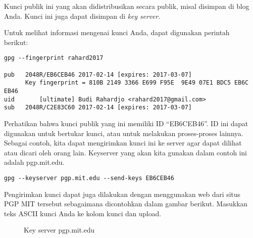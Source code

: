 Kunci publik ini yang akan didistribusikan secara publik, misal disimpan di
blog Anda. Kunci ini juga dapat disimpan di {\em key server}.

Untuk melihat informasi mengenai kunci Anda, dapat digunakan perintah berikut:

\begin{verbatim}
gpg --fingerprint rahard2017

pub   2048R/EB6CEB46 2017-02-14 [expires: 2017-03-07]
      Key fingerprint = 810B 2149 3366 E699 F95E  9E49 07E1 BDC5 EB6C EB46
uid       [ultimate] Budi Rahardjo <rahard2017@gmail.com>
sub   2048R/C2E83C60 2017-02-14 [expires: 2017-03-07]
\end{verbatim}

Perhatikan bahwa kunci publik yang ini memiliki ID ``EB6CEB46''. ID ini dapat
digunakan untuk bertukar kunci, atau untuk melakukan proses-proses lainnya.
Sebagai contoh, kita dapat mengirimkan kunci ini ke server agar dapat dilihat
atau dicari oleh orang lain. Keyserver yang akan kita gunakan dalam contoh ini
adalah pgp.mit.edu.

\begin{verbatim}
gpg --keyserver pgp.mit.edu --send-keys EB6CEB46
\end{verbatim}

Pengirimkan kunci dapat juga dilakukan dengan menggunakan web dari situs PGP
MIT tersebut sebagaimana dicontohkan dalam gambar berikut. Masukkan teks ASCII
kunci Anda ke kolom kunci dan upload.

\begin{figure}[ht]
\caption{Key server pgp.mit.edu}
\label{fig:pgp-mit}
\end{figure}


\begin{mdframed}[backgroundcolor=blue!20] 
\begin{ExerciseList}
   \Exercise[title=Membuat Kunci]
\end{ExerciseList}

\end{mdframed}


